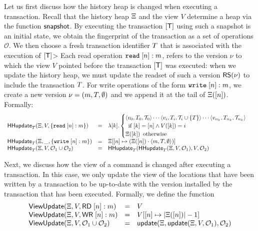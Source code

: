 \documentclass[a4paper,UKenglish]{article}%
\theoremstyle{plain}
\begin{document}
Let us first discuss how the history heap is changed when executing a transaction. 
Recall that the history heap $\Xi$ and the view $V$ determine a heap 
via the function $\mathsf{snapshot}$. By executing the transaction $[\mathsf{T}]$ using 
such a snapshot is an initial state, we obtain the fingerprint of the transaction 
as a set of operations $\mathcal{O}$. We then choose a fresh transaction identifier 
$T$ that is associated with the execution of $[\mathsf{T}]$> 
Each read operation ${{\tt read}}\;[n]:m$, 
refers to the version $\nu$ to which the view $V$ pointed before the transaction $[\mathsf{T}]$ 
was executed: when we update the history heap, we must update the readset of 
such a version $\mathsf{RS}(\nu)$ to include the transaction $T$. For write 
operations of the form ${{\tt write}}\;[n]:m$, we create a new version 
$\nu = (m, T, \emptyset)$ and we append it at the tail of $\Xi([n])$.
Formally: 
\[
\begin{array}{lll}
\mathsf{HHupdate}_{T}(\Xi, V, \{{{\tt read}}\;[n]: m\}) &=& 
\lambda [k].\begin{cases}
\langle v_0, T_{0}, \mathcal{T}_{0} \rangle \cdots \langle v_i, T_{i}, \mathcal{T}_{i} \cup \{T\} \rangle \cdots \langle v_{n_{k}}, T_{n_{k}}, \mathcal{T}_{n_{k}} \rangle\\
\hspace{5pt} \text{if } [k] = [n] \wedge V([k]) = i &\\
\Xi([k]) \hspace{5pt} \text{otherwise}
\end{cases}\\
\mathsf{HHupdate}_{T}(\Xi, \_, \{{{\tt write}}\; [n]: m\}) &=& 
\Xi[ [n] \mapsto ( \Xi([n]) \cdot \langle m, T, \emptyset \rangle) ]\\
\mathsf{HHupdate}_{T}(\Xi, V, \mathcal{O}_1 \cup \mathcal{O}_2) &=& 
\mathsf{HHupdate}_{T}(\mathsf{HHupdate}_{T}(\Xi, V, \mathcal{O}_1), V, \mathcal{O}_2)
\end{array}
\]

Next, we discuss how the view of a command is changed after executing 
a transaction. In this case, we only update the view of the locations that 
have been written by a transaction to be up-to-date with the version 
installed by the transaction that has been executed. 
Formally, we define the function 
\[
\begin{array}{lll}
\mathsf{ViewUpdate}(\Xi, V, \mathsf{RD}\;[n]: m) &=& V\\
\mathsf{ViewUpdate}(\Xi, V, \mathsf{WR}\;[n]: m) &=& V[ [n] \mapsto \lvert \Xi([n]) \rvert -1 ]\\
\mathsf{ViewUpdate}(\Xi, V, \mathcal{O}_1 \cup \mathcal{O}_2) &=& \mathsf{update}(\Xi, \mathsf{update}(\Xi, V, \mathcal{O}_1), \mathcal{O}_2)
\end{array}
\]
\end{document}
